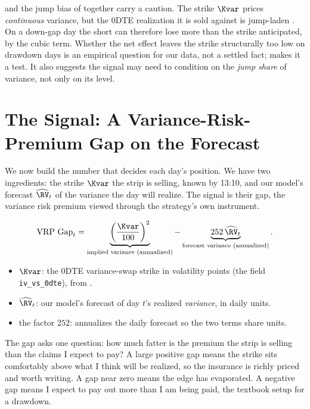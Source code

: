 \begin{warning}
 and the jump bias of  together carry a caution. The strike $\Kvar$ prices \emph{continuous} variance, but the 0DTE realization it is sold against is jump-laden \citep{DuKapadia2012}. On a down-gap day the short can therefore lose more than the strike anticipated, by the cubic term. Whether the net effect leaves the strike structurally too low on drawdown days is an empirical question for our data, not a settled fact;  makes it a test. It also suggests the signal may need to condition on the \emph{jump share} of variance, not only on its level.
\end{warning}

\section{The Signal: A Variance-Risk-Premium Gap on the Forecast}
\label{sec:gsvivs:signal}

We now build the number that decides each day's position. We have two ingredients: the strike $\Kvar$ the strip is selling, known by 13:10, and our model's forecast $\widehat{\RV}_t$ of the variance the day will realize. The signal is their gap, the variance risk premium viewed through the strategy's own instrument.

\begin{equation}
\label{eq:gsvivs:vrpgap}
\text{VRP Gap}_t = \underbrace{\left(\frac{\Kvar}{100}\right)^2}_{\text{implied variance (annualized)}} - \underbrace{252\,\widehat{\RV}_t}_{\text{forecast variance (annualized)}}.
\end{equation}
\begin{itemize}
  \item $\Kvar$: the 0DTE variance-swap strike in volatility points (the field \texttt{iv\_vs\_0dte}), from .
  \item $\widehat{\RV}_t$: our model's forecast of day $t$'s realized \emph{variance}, in daily units.
  \item the factor $252$: annualizes the daily forecast so the two terms share units.
\end{itemize}

\begin{intuition}
The gap asks one question: how much fatter is the premium the strip is selling than the claims I expect to pay? A large positive gap means the strike sits comfortably above what I think will be realized, so the insurance is richly priced and worth writing. A gap near zero means the edge has evaporated. A negative gap means I expect to pay out more than I am being paid, the textbook setup for a drawdown.
\end{intuition}

